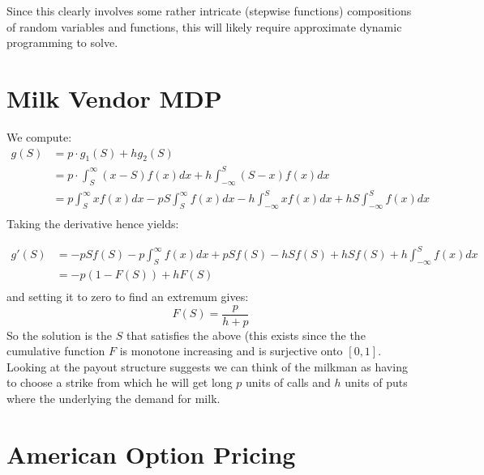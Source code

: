 \documentclass{article}[12pt]
\begin{document}
Since this clearly involves some rather intricate (stepwise functions) compositions of random variables and functions, this will likely require approximate dynamic programming to solve.

\section{Milk Vendor MDP}
We compute:
\begin{align*}
g(S) &= p\cdot g_1(S) + h g_2(S)\\
&= p\cdot \int_{S}^{\infty} (x-S)f(x)dx+ h \int_{-\infty}^S (S-x)f(x)dx\\
&= p \int_{S}^{\infty}xf(x)dx-pS\int_{S}^{\infty}f(x)dx- h \int_{-\infty}^Sxf(x)dx + hS\int_{-\infty}^Sf(x)dx\\
\end{align*}
Taking the derivative hence yields:

\begin{align*}
g'(S) &= -pSf(S)-p\int_{S}^{\infty}f(x)dx + pSf(S) - h Sf(S) + hSf(S)+h\int_{-\infty}^Sf(x)dx\\
&= -p(1-F(S)) +hF(S)\\
\end{align*}
and setting it to zero to find an extremum gives:
$$ F(S) = \frac{p}{h+p}$$
So the solution is the $S$ that satisfies the above (this exists since the the cumulative function $F$ is monotone increasing and is surjective onto $[0,1]$.\\

Looking at the payout structure suggests we can think of the milkman as having to choose a strike from which he will get long $p$ units of calls and $h$ units of puts where the underlying the demand for milk.

\section{American Option Pricing}
\end{document}
